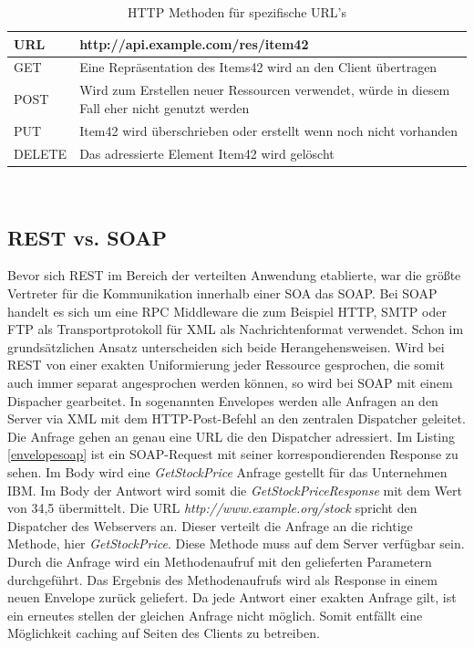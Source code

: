 \documentclass[fleqn,10.5pt,ngerman]{SelfArx}
\begin{document}
\begin{table}[hbt]
	\caption{HTTP Methoden für spezifische URL's}
	\centering
	\begin{tabular}{ |p{2cm}|p{5.5cm}|}
		\toprule
		\cmidrule(r){1-2}
		URL & \textbf{http://api.example.com/res/item42}\\
		\midrule
		GET & Eine Repräsentation des Items42 wird an den Client übertragen\\
		\midrule
		POST & Wird zum Erstellen neuer Ressourcen verwendet, würde in diesem Fall eher nicht genutzt werden\\
		\midrule
		PUT & Item42 wird überschrieben oder erstellt wenn noch nicht vorhanden\\
		\midrule
		DELETE & Das adressierte Element Item42 wird gelöscht\\
		\bottomrule
	\end{tabular}\\
	\label{tab:httptable}
\end{table}

\subsection{REST vs. SOAP}
Bevor sich REST im Bereich der verteilten Anwendung etablierte, war die größte Vertreter für die Kommunikation innerhalb einer SOA das SOAP. Bei SOAP handelt es sich um eine RPC Middleware die zum Beispiel HTTP, SMTP oder FTP als Transportprotokoll für XML als Nachrichtenformat verwendet. Schon im grundsätzlichen Ansatz unterscheiden sich beide Herangehensweisen. Wird bei REST von einer exakten Uniformierung jeder Ressource gesprochen, die somit auch immer separat angesprochen werden können, so wird bei SOAP mit einem Dispacher gearbeitet. In sogenannten Envelopes werden alle Anfragen an den Server via XML mit dem HTTP-Post-Befehl an den zentralen Dispatcher geleitet. Die Anfrage gehen an genau eine URL die den Dispatcher adressiert. Im Listing \ref{envelopesoap} ist ein SOAP-Request mit seiner korrespondierenden Response zu sehen. Im Body wird eine \textit{GetStockPrice} Anfrage gestellt für das Unternehmen IBM. Im Body der Antwort wird somit die \textit{GetStockPriceResponse} mit dem Wert von 34,5 übermittelt. Die URL \textit{http://www.example.org/stock} spricht den Dispatcher des Webservers an. Dieser verteilt die Anfrage an die richtige Methode, hier \textit{GetStockPrice}. Diese Methode muss auf dem Server verfügbar sein. Durch die Anfrage wird ein Methodenaufruf mit den gelieferten Parametern durchgeführt. Das Ergebnis des Methodenaufrufs wird als Response in einem neuen Envelope zurück geliefert. Da jede Antwort einer exakten Anfrage gilt, ist ein erneutes stellen der gleichen Anfrage nicht möglich. Somit entfällt eine Möglichkeit caching auf Seiten des Clients zu betreiben.
\end{document}
